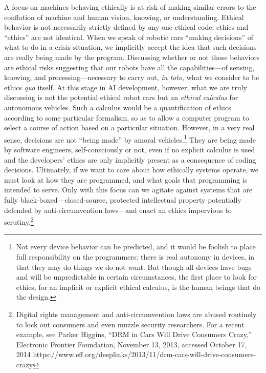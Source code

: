 A focus on machines behaving ethically is at risk of making similar
errors to the conflation of machine and human vision, knowing, or
understanding. Ethical behavior is not necessarily strictly defined by
any one ethical code:  ethics and ``ethics'' are not identical. When we
speak of robotic cars ``making decisions'' of what to do in a crisis
situation, we implicitly accept the idea that such decisions are
really being made by the program. Discussing whether or not those
behaviors are ethical risks suggesting that our robots have all the
capabilities---of sensing, knowing, and processing---necessary to
carry out, \emph{in toto}, what we consider to be ethics \emph{qua} itself. At this
stage in AI development, however, what we are truly discussing is not
the potential ethical robot cars but an \emph{ethical calculus} for
autonomous vehicles. Such a calculus would be a quantification of
ethics according to some particular formalism, so as to allow a
computer program to select a course of action based on a particular
situation. However, in a very real sense, decisions are not
``being made'' by amoral vehicles.\footnote{Not every device behavior
can be predicted, and it would be foolish to place full responsibility
on the programmers: there is real autonomy in devices, in that they
may do things we do not want. But though all devices have bugs and
will be unpredictable in certain circumstances, the first place to
look for ethics, for an implicit or explicit ethical calculus, is the human beings
that do the design.} They are being made by software engineers,
self-consciously or not, even if no
explicit calculus is used and the developers' ethics are only
implicitly present as a consequence of coding decisions. Ultimately,
if we want to care about how ethically systems
operate, we must look at how they are programmed, and what goals that
programming is intended to serve. Only with this focus can we agitate
against systems that are fully black-boxed---closed-source, protected
intellectual property potentially defended by anti-circumvention
laws---and enact an ethics impervious to scrutiny.\footnote{Digital
  rights management and anti-circumvention laws are abused routinely
  to lock out consumers and even muzzle security researchers. For a
  recent example, see \cite{???-higgins}  Parker Higgins, “DRM in Cars Will Drive Consumers
  Crazy,” Electronic Frontier Foundation, November 13, 2013, accessed
  October 17, 2014
  https://www.eff.org/deeplinks/2013/11/drm-cars-will-drive-consumers-crazy
}



